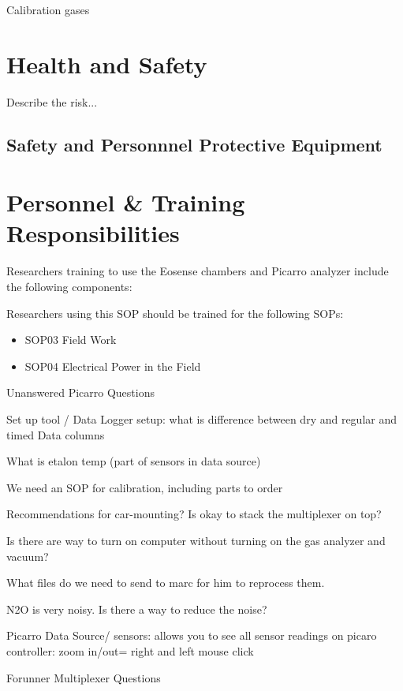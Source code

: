\documentclass[12pt]{../SOP3}\usepackage[]{graphicx}\usepackage[]{color}
\begin{document}
\NP Calibration gases

\section{Health and Safety}

\NP Describe the risk...


\subsection*{Safety and Personnnel Protective Equipment}


\section{Personnel \& Training Responsibilities}

Researchers training to use the Eosense chambers and Picarro analyzer include the following components: 



Researchers using this SOP should be trained for the following SOPs:

\begin{itemize}
  \item SOP03 Field Work
  \item SOP04 Electrical Power in the Field
\end{itemize}

Unanswered Picarro Questions

\NP Set up tool / Data Logger setup: what is difference between dry and regular and timed Data columns

\NP What is etalon temp (part of sensors in data source)

\NP We need an SOP for calibration, including parts to order

\NP Recommendations for car-mounting? Is okay to stack the multiplexer on top?

\NP Is there are way to turn on computer without turning on the gas analyzer and vacuum? 

\NP What files do we need to send to marc for him to reprocess them.

\NP N2O is very noisy. Is there a way to reduce the noise?

Picarro
Data Source/ sensors: allows you to see all sensor readings on picaro
controller: zoom in/out= right and left mouse click






Forunner Multiplexer Questions
\end{document}
